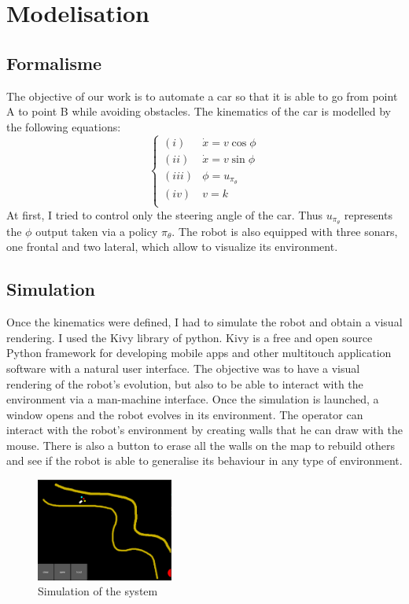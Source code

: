 \section{Modelisation}
    \subsection{Formalisme}
    The objective of our work is to automate a car so that it is able to go from point A to point B while avoiding obstacles.
    The kinematics of the car is modelled by the following equations:
        \begin{equation}
            \label{eqn:constrains}
            \begin{cases}
                (\mathit{i}) & \dot{x} = v\cos{\phi} \\
                (\mathit{ii}) & \dot{x} = v\sin{\phi} \\
                (\mathit{iii}) & \phi=u_{\pi_{\theta}} \\
                (\mathit{iv}) &  v = k \\
               
            \end{cases}
        \end{equation}
    At first, I tried to control only the steering angle of the car. Thus $u_{\pi_{\theta}}$ represents the $\phi$ output taken via a policy $\pi_{\theta}$.
    The robot is also equipped with three sonars, one frontal and two lateral, which allow to visualize its environment.

    \subsection{Simulation}
    Once the kinematics were defined, I had to simulate the robot and obtain a visual rendering. I used the Kivy library of python. 
    Kivy is a free and open source Python framework for developing mobile apps and other multitouch application software with a natural user interface.
    The objective was to have a visual rendering of the robot's evolution, but also to be able to interact with the environment via a man-machine interface. 
    Once the simulation is launched, a window opens and the robot evolves in its environment. The operator can interact with the robot's environment by creating walls that he can draw with the mouse. 
    There is also a button to erase all the walls on the map to rebuild others and see if the robot is able to generalise its behaviour in any type of environment.
    \begin{figure}[!htb]
        \centering
        \includegraphics[width=0.4\textwidth]{imgs/simulator.png}
        \caption{\label{fig:simulation} Simulation of the system}
    \end{figure}


